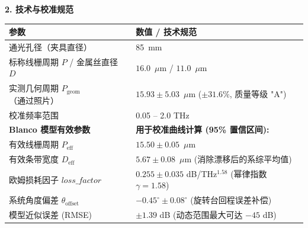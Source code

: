 \documentclass[11pt]{article}
\begin{document}
	\vspace{0.3em}
	
	\noindent\textbf{2. 技术与校准规范}
	\begin{table}[H]
		\centering
		\small %
		\begin{tabularx}{\textwidth}{lX}
			\toprule
			\textbf{参数} & \textbf{数值 / 技术规范} \\
			\midrule
			通光孔径（夹具直径） & 85~mm \\
			标称线栅周期 $P$ / 金属丝直径 $D$ & $16.0$~$\mu$m / $11.0$~$\mu$m \\
			实测几何周期 $P_{\text{geom}}$（通过照片） & $15.93 \pm 5.03$~$\mu$m ($\pm 31.6\%$, 质量等级 "A") \\
			校准频率范围 & 0.05 -- 2.0 THz \\
			\midrule
			\textbf{Blanco 模型有效参数} & \textbf{用于校准曲线计算 (95\% 置信区间):} \\
			有效线栅周期 $P_{\text{eff}}$ & $15.50 \pm 0.05$~$\mu$m \\
			有效条带宽度 $D_{\text{eff}}$\footnotemark[1] & $5.67 \pm 0.08$~$\mu$m (消除漂移后的系综平均值) \\
			欧姆损耗因子 $loss\_factor$ & $0.255 \pm 0.035$ dB/THz$^{1.58}$ (幂律指数 $\gamma = 1.58$) \\
			系统角度偏差 $\theta_{\text{offset}}$ & $-0.45^\circ \pm 0.08^\circ$ (旋转台回程误差补偿) \\
			模型近似误差 (RMSE)\footnotemark[2] & $\pm 1.39$ dB (动态范围最大可达 $-45$ dB) \\
			\bottomrule
		\end{tabularx}
	\end{table}
	
	\vspace{-0.5em}
	
\end{document}
